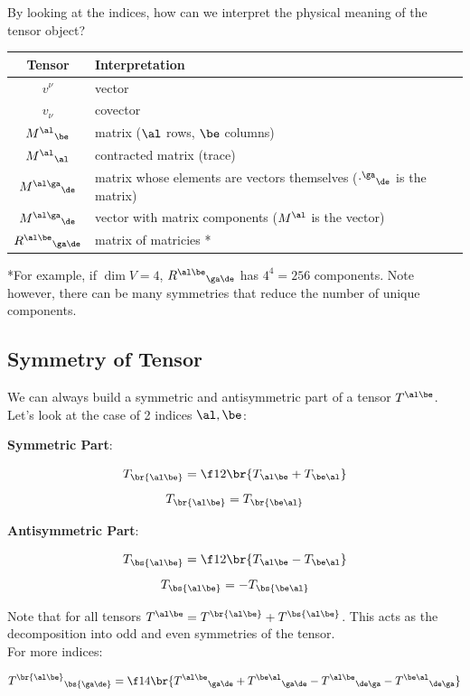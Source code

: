 \documentclass{article}
\newcommand{\heading}[1]{\vspace{0.1in}\textbf{#1}:}
\begin{document}
By looking at the indices, how can we interpret the physical meaning of the tensor object? \\

\begin{tabular}{c|l}
    Tensor & Interpretation \\
    \hline
    $v^\nu$ & vector \\
    $v_\nu$ & covector \\
    ${M^\al}_\be$ & matrix ($\al$ rows, $\be$ columns) \\
    ${M^\al}_\al$ & contracted matrix (trace) \\
    ${M^{\al\ga}}_\de$ & matrix whose elements are vectors themselves (${\cdot^\ga}_\de$ is the matrix) \\
    ${M^{\al\ga}}_\de$ & vector with matrix components (${M^\al}$ is the vector) \\
    ${R^{\al\be}}_{\ga\de}$ & matrix of matricies *\\
\end{tabular}
\vspace{0.1in}

*For example, if $\dim V = 4$, ${R^{\al\be}}_{\ga\de}$ has $4^4 = 256$ components. Note however, there can be many symmetries that reduce the number of unique components.

\subsection{Symmetry of Tensor}

We can always build a symmetric and antisymmetric part of a tensor $T^{\al\be}$. Let's look at the case of 2 indices $\al, \be$:

\heading{Symmetric Part}

\[ T_{\br{\al\be}} = \f12 \br{T_{\al\be} + T_{\be\al}} \]
\[ T_{\br{\al\be}} = T_{\br{\be\al}}  \]

\heading{Antisymmetric Part}

\[ T_{\bs{\al\be}} = \f12 \br{T_{\al\be} - T_{\be\al}} \]
\[ T_{\bs{\al\be}} = - T_{\bs{\be\al}}  \]

Note that for all tensors $T^{\al\be} = T^{\br{\al\be}} + T^{\bs{\al\be}}$. This acts as the decomposition into odd and even symmetries of the tensor. \\

For more indices:

\[ {T^{\br{\al\be}}}_{\bs{\ga\de}} = \f14\br{{T^{\al\be}}_{\ga\de} + {T^{\be\al}}_{\ga\de} - {T^{\al\be}}_{\de\ga} - {T^{\be\al}}_{\de\ga}} \]
\end{document}
